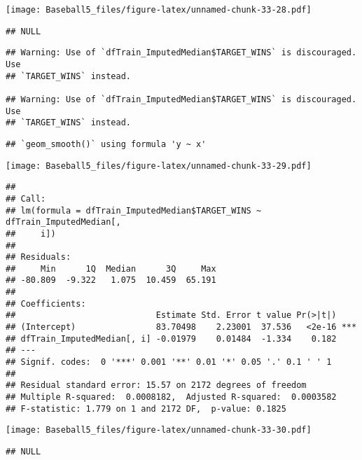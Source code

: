 \documentclass[
]{article}
\begin{document}
\texttt{[image: Baseball5\_files/figure-latex/unnamed-chunk-33-28.pdf]}

\begin{verbatim}
## NULL
\end{verbatim}

\begin{verbatim}
## Warning: Use of `dfTrain_ImputedMedian$TARGET_WINS` is discouraged. Use
## `TARGET_WINS` instead.

## Warning: Use of `dfTrain_ImputedMedian$TARGET_WINS` is discouraged. Use
## `TARGET_WINS` instead.
\end{verbatim}

\begin{verbatim}
## `geom_smooth()` using formula 'y ~ x'
\end{verbatim}

\texttt{[image: Baseball5\_files/figure-latex/unnamed-chunk-33-29.pdf]}

\begin{verbatim}
## 
## Call:
## lm(formula = dfTrain_ImputedMedian$TARGET_WINS ~ dfTrain_ImputedMedian[, 
##     i])
## 
## Residuals:
##     Min      1Q  Median      3Q     Max 
## -80.809  -9.322   1.075  10.459  65.191 
## 
## Coefficients:
##                            Estimate Std. Error t value Pr(>|t|)    
## (Intercept)                83.70498    2.23001  37.536   <2e-16 ***
## dfTrain_ImputedMedian[, i] -0.01979    0.01484  -1.334    0.182    
## ---
## Signif. codes:  0 '***' 0.001 '**' 0.01 '*' 0.05 '.' 0.1 ' ' 1
## 
## Residual standard error: 15.57 on 2172 degrees of freedom
## Multiple R-squared:  0.0008182,  Adjusted R-squared:  0.0003582 
## F-statistic: 1.779 on 1 and 2172 DF,  p-value: 0.1825
\end{verbatim}

\texttt{[image: Baseball5\_files/figure-latex/unnamed-chunk-33-30.pdf]}

\begin{verbatim}
## NULL
\end{verbatim}
\end{document}
